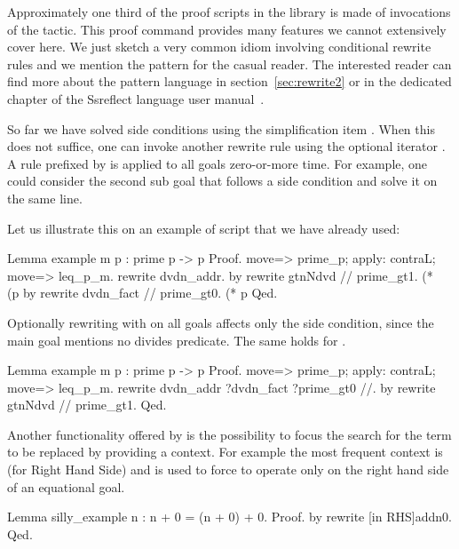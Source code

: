 \label{sec:rewrite}

Approximately one third of the proof scripts in the \mcbMC{} library is made of
invocations of the  tactic. This proof command provides many
features we cannot extensively cover here.  We just sketch a very common idiom
involving conditional rewrite rules and we mention the  pattern for
the casual reader.  The interested reader can find more about the pattern
language in section~\ref{sec:rewrite2} or in the dedicated chapter of
the Ssreflect language user manual~\cite{ssrman}.

So far we have solved side conditions using the simplification item \C{//}.
When this does not suffice, one can invoke another rewrite rule using
the optional iterator .  A rule prefixed by  is applied to
all goals zero-or-more time.  For example, one could consider the
second sub goal that follows  a side condition
and solve it on the same line.

Let us illustrate this on an example of script that we have already used:

\begin{coq}{}{}
Lemma example m p : prime p -> p %
Proof.
move=> prime_p; apply: contraL; move=> leq_p_m.
rewrite dvdn_addr.
  by rewrite gtnNdvd // prime_gt1. (* ~~ (p %
by rewrite dvdn_fact // prime_gt0. (* p %
Qed.
\end{coq}

Optionally rewriting with  on all goals affects only
the side condition, since the main goal mentions no divides predicate.
The same holds for .

\begin{coq}{}{}
Lemma example m p : prime p -> p %
Proof.
move=> prime_p; apply: contraL; move=> leq_p_m.
rewrite dvdn_addr ?dvdn_fact ?prime_gt0 //.
by rewrite gtnNdvd // prime_gt1.
Qed.
\end{coq}

Another functionality offered by  is the possibility
to focus the search for the term to be replaced by providing a
context.  For example the most frequent context is  (for Right
Hand Side) and is used to force  to operate only on the right
hand side of an equational goal.

\begin{coq}{}{}
Lemma silly_example n : n + 0 = (n + 0) + 0.
Proof. by rewrite [in RHS]addn0. Qed.
\end{coq}

